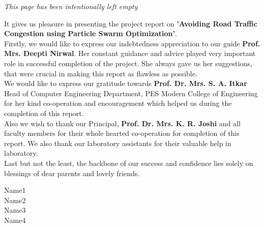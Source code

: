 \documentclass[twoside,a4paper,12pt]{book}
\begin{document}
\newpage






\begin{center}
\vspace*{0.4\textwidth}
\emph{This page has been intentionally left empty}    
\end{center}



{   \setlength{\parindent}{11mm} }
{ \setlength{\parindent}{0mm} }
 \pagestyle{special} 
\normalsize
It gives us pleasure in presenting the project report on \textbf{'Avoiding Road Traffic Congestion using Particle Swarm Optimization'}.\\

Firstly, we would like to express our indebtedness appreciation to our guide \textbf{Prof. Mrs. Deepti Nirwal}. Her constant guidance and advice played very important role in successful completion of the project. She always gave us her suggestions, that were crucial in making this report as flawless as possible.\\

We would like to express our gratitude towards \textbf{Prof. Dr. Mrs. S. A. Itkar}  Head of Computer Engineering Department, PES Modern College of Engineering for her kind co-operation and encouragement which helped us during the completion of this report.\\

Also we wish to thank our Principal, \textbf{Prof. Dr. Mrs. K. R. Joshi} and all faculty members for their whole hearted co-operation for completion of this report. We also thank our laboratory assistants for their valuable help in laboratory. \\

Last but not the least, the backbone of our success and confidence lies solely on blessings of dear parents and lovely friends.

\begin{flushright}
Name1\\
Name2\\
Name3\\
Name4\\
\end{flushright}
\end{document}
